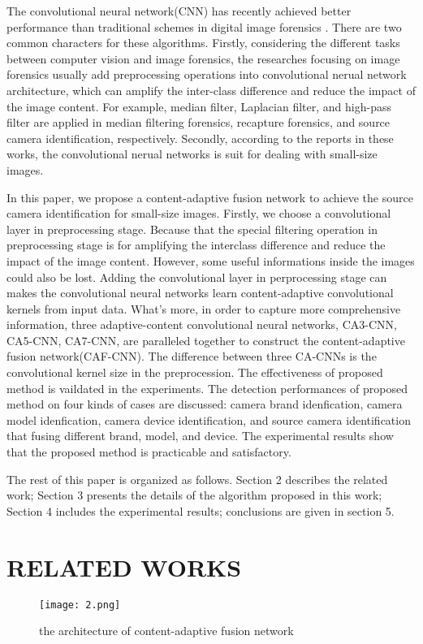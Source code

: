 \documentclass{article}
\begin{document}
The convolutional neural network(CNN) has recently achieved better performance than traditional schemes in digital image forensics \cite{16,17,18,19}. There are two common characters for these algorithms. Firstly, considering the different tasks between computer vision and image forensics, the researches focusing on image forensics usually add preprocessing operations into convolutional nerual network architecture, which can amplify the inter-class difference and reduce the impact of the image content. For example, median filter, Laplacian filter, and high-pass filter are applied in median filtering forensics, recapture forensics, and source camera identification, respectively. Secondly, according to the reports in these works, the convolutional nerual networks is suit for dealing with small-size images.  

In this paper, we propose a content-adaptive fusion network to achieve the source camera identification for small-size images. Firstly, we choose a convolutional layer in preprocessing stage. Because that the special filtering operation in preprocessing stage is for amplifying the interclass difference and reduce the impact of the image content. However, some useful informations inside the images could also be lost. Adding the convolutional layer in perprocessing stage can makes the convolutional neural networks learn content-adaptive convolutional kernels from input data. What's more, in order to capture more comprehensive information, three adaptive-content convolutional neural networks, CA3-CNN, CA5-CNN, CA7-CNN, are paralleled together to construct the content-adaptive fusion network(CAF-CNN). The difference between three CA-CNNs is the convolutional kernel size in the preprocession. The effectiveness of proposed method is vaildated in the experiments. The detection performances of proposed method on four kinds of cases are discussed: camera brand idenfication, camera model idenfication, camera device identification, and source camera identification that fusing different brand, model, and device. The experimental results show that the proposed method is practicable and satisfactory.

The rest of this paper is organized as follows. Section 2 describes the related work; Section 3 presents the details of the algorithm proposed in this work; Section 4 includes the experimental results; conclusions are given in section 5. 



\section{RELATED WORKS}
\label{sec:format}
\begin{figure*}[!tp]
	\centering
	\texttt{[image: 2.png]}
	\caption{the architecture of content-adaptive fusion network}
\end{figure*}
\end{document}

